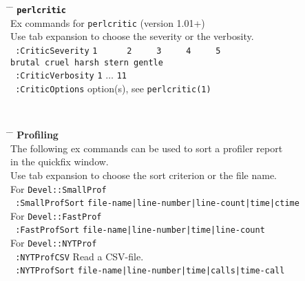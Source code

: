 \documentclass[oneside,10pt,landscape,DIV17]{scrartcl}
\begin{document}
\begin{multicols}{2}
%
\parbox[t][50mm][t]{120mm}{%
%
\begin{tabbing}
\hspace{30mm} \= \hspace{50mm} \= \kill
%
\textbf{\texttt{perlcritic}}\\[1.0ex]
%
Ex commands for \texttt{perlcritic} (version 1.01+)\\
Use tab expansion to choose the severity or the verbosity.\\[2.0ex]
\texttt{ :CriticSeverity}  \> \texttt{1\ \ \ \ \ \ 2\ \ \ \ \ 3\ \ \ \ \ 4\ \ \ \ \ 5} \\
                           \> \texttt{brutal cruel harsh stern gentle} \\[1.0ex]
\texttt{ :CriticVerbosity} \> \texttt{1} $\ldots$ \texttt{11}\\[1.0ex]
\texttt{ :CriticOptions}   \> option(s), see \texttt{perlcritic(1)}\\[5.5ex]
%
\end{tabbing}%
}\\
%
\parbox[t][70mm][t]{120mm}{%
%
\begin{tabbing}
\hspace{30mm} \= \hspace{50mm} \= \kill
%
\large{\textbf{Profiling}}\\[1.0ex]
%
The following ex commands can be used to sort a profiler report \\in the quickfix window.\\
Use tab expansion to choose the sort criterion or the file name.\\[2.0ex]
%
For \texttt{Devel::SmallProf}\\[1.0ex]
\texttt{ :SmallProfSort}   \> \texttt{file-name|line-number|line-count|time|ctime}\\[3.0ex]
%
%
For \texttt{Devel::FastProf}\\[1.0ex]
\texttt{ :FastProfSort}    \> \texttt{file-name|line-number|time|line-count}\\[3.0ex]
%
%
For \texttt{Devel::NYTProf}\\[1.0ex]
\texttt{ :NYTProfCSV}      \> Read a CSV-file.\\[1.0ex]
%
%
\texttt{ :NYTProfSort}     \> \texttt{file-name|line-number|time|calls|time-call}\\
%
\end{tabbing}
}
\end{multicols}%
%
\end{document}
